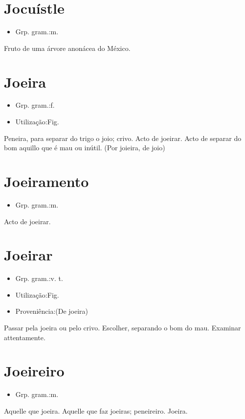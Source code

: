 \documentclass{article}
\begin{document}
\section{Jocuístle}
\begin{itemize}
\item {Grp. gram.:m.}
\end{itemize}
Fruto de uma árvore anonácea do México.
\section{Joeira}
\begin{itemize}
\item {Grp. gram.:f.}
\end{itemize}
\begin{itemize}
\item {Utilização:Fig.}
\end{itemize}
Peneira, para separar do trigo o joio; crivo.
Acto de joeirar.
Acto de separar do bom aquillo que é mau ou inútil.
(Por \textunderscore joieira\textunderscore , de \textunderscore joio\textunderscore )
\section{Joeiramento}
\begin{itemize}
\item {Grp. gram.:m.}
\end{itemize}
Acto de joeirar.
\section{Joeirar}
\begin{itemize}
\item {Grp. gram.:v. t.}
\end{itemize}
\begin{itemize}
\item {Utilização:Fig.}
\end{itemize}
\begin{itemize}
\item {Proveniência:(De \textunderscore joeira\textunderscore )}
\end{itemize}
Passar pela joeira ou pelo crivo.
Escolher, separando o bom do mau.
Examinar attentamente.
\section{Joeireiro}
\begin{itemize}
\item {Grp. gram.:m.}
\end{itemize}
Aquelle que joeira.
Aquelle que faz joeiras; peneireiro.
Joeira.
\end{document}
